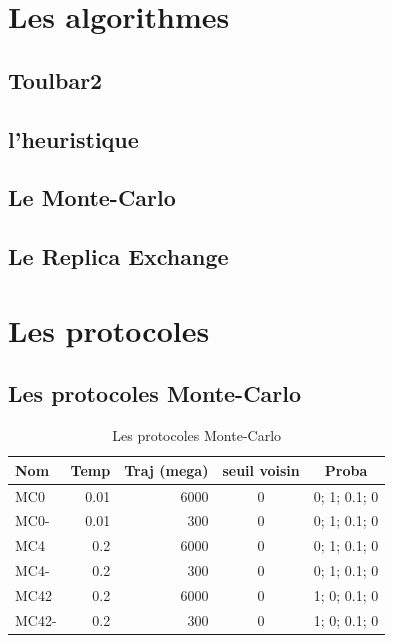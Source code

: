 \documentclass[a4paper,12pt]{article}
\begin{document}
\listoffigures
 
   \section{Les algorithmes} 

   \subsection{Toulbar2} 
   \subsection{l'heuristique} 
   \subsection{Le Monte-Carlo}
   \subsection{Le Replica Exchange}
 
   \section{Les protocoles} 



   \subsection{Les protocoles Monte-Carlo} 
    
    \begin{table}[!htbp]
      \centering

      \begin{tabular}{|l|r|r|c|c|}

        \hline
        Nom & Temp & Traj (mega)& seuil voisin  & Proba \\
        \hline
        MC0   & 0.01  &  6000 & 0 & 0; 1; 0.1; 0   \\  
        MC0-  & 0.01  &   300 & 0 & 0; 1; 0.1; 0   \\  
        MC4   & 0.2   &  6000 & 0 & 0; 1; 0.1; 0   \\          
        MC4-  & 0.2   &   300 & 0 & 0; 1; 0.1; 0   \\ 
        MC42  & 0.2   &  6000 & 0 & 1; 0; 0.1; 0   \\        
        MC42- & 0.2   &   300 & 0 & 1; 0; 0.1; 0   \\   \hline                   

       
      \end{tabular}      
      \caption{Les protocoles Monte-Carlo}
      \label{tab_protoMC}      
    \end{table}
\end{document}
